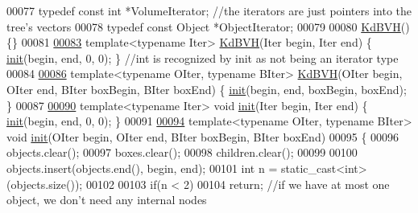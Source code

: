 \begin{DoxyCode}
00077   \textcolor{keyword}{typedef} \textcolor{keyword}{const} \textcolor{keywordtype}{int} *VolumeIterator; \textcolor{comment}{//the iterators are just pointers into the tree's vectors}
00078   \textcolor{keyword}{typedef} \textcolor{keyword}{const} Object *ObjectIterator;
00079 
00080   \hyperlink{class_eigen_1_1_kd_b_v_h}{KdBVH}() \{\}
00081 
\hyperlink{class_eigen_1_1_kd_b_v_h_a87d240e2d6ac5e87fc2e4ae6e0fe4bdc}{00083}   \textcolor{keyword}{template}<\textcolor{keyword}{typename} Iter> \hyperlink{class_eigen_1_1_kd_b_v_h_a87d240e2d6ac5e87fc2e4ae6e0fe4bdc}{KdBVH}(Iter begin, Iter end) \{ \hyperlink{structinit}{init}(begin, end, 0, 0); \} \textcolor{comment}{//int is
       recognized by init as not being an iterator type}
00084 
\hyperlink{class_eigen_1_1_kd_b_v_h_a94f781127eeec80a7659b8a625e2fa94}{00086}   \textcolor{keyword}{template}<\textcolor{keyword}{typename} OIter, \textcolor{keyword}{typename} BIter> \hyperlink{class_eigen_1_1_kd_b_v_h_a94f781127eeec80a7659b8a625e2fa94}{KdBVH}(OIter begin, OIter end, BIter boxBegin, BIter boxEnd)
       \{ \hyperlink{structinit}{init}(begin, end, boxBegin, boxEnd); \}
00087 
\hyperlink{class_eigen_1_1_kd_b_v_h_a431eed3c2567a854fb350f0b327d3307}{00090}   \textcolor{keyword}{template}<\textcolor{keyword}{typename} Iter> \textcolor{keywordtype}{void} \hyperlink{class_eigen_1_1_kd_b_v_h_a431eed3c2567a854fb350f0b327d3307}{init}(Iter begin, Iter end) \{ \hyperlink{class_eigen_1_1_kd_b_v_h_a431eed3c2567a854fb350f0b327d3307}{init}(begin, end, 0, 0); \}
00091 
\hyperlink{class_eigen_1_1_kd_b_v_h_a10a9c8f6d596d7a2cd285a3fb3e8c053}{00094}   \textcolor{keyword}{template}<\textcolor{keyword}{typename} OIter, \textcolor{keyword}{typename} BIter> \textcolor{keywordtype}{void} \hyperlink{class_eigen_1_1_kd_b_v_h_a10a9c8f6d596d7a2cd285a3fb3e8c053}{init}(OIter begin, OIter end, BIter boxBegin, BIter 
      boxEnd)
00095   \{
00096     objects.clear();
00097     boxes.clear();
00098     children.clear();
00099 
00100     objects.insert(objects.end(), begin, end);
00101     \textcolor{keywordtype}{int} n = \textcolor{keyword}{static\_cast<}\textcolor{keywordtype}{int}\textcolor{keyword}{>}(objects.size());
00102 
00103     \textcolor{keywordflow}{if}(n < 2)
00104       \textcolor{keywordflow}{return}; \textcolor{comment}{//if we have at most one object, we don't need any internal nodes}

\end{DoxyCode}
